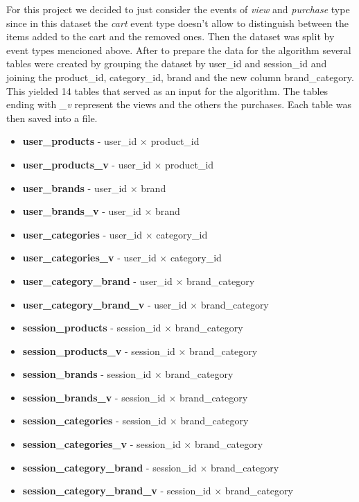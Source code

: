 For this project we decided to just consider the events of \textit{view} and \textit{purchase} type since 
in this dataset the \textit{cart} event type doesn't allow to distinguish between the items added to the cart and the removed ones.
Then the dataset was split by event types mencioned above. After to prepare the data for the algorithm several tables were created by grouping the dataset by user\_id and session\_id and
joining the product\_id, category\_id, brand and the new column brand\_category.
This yielded 14 tables that served as an input for the algorithm.
The tables ending with \textit{\_v} represent the views and the others the purchases.
Each table was then saved into a file.
\begin{itemize}
    \item \textbf{user\_products} - user\_id $\times$ product\_id
    \item \textbf{user\_products\_v} - user\_id $\times$ product\_id
    \item \textbf{user\_brands} - user\_id $\times$ brand
    \item \textbf{user\_brands\_v} - user\_id $\times$ brand
    \item \textbf{user\_categories} - user\_id $\times$ category\_id
    \item \textbf{user\_categories\_v} - user\_id $\times$ category\_id
    \item \textbf{user\_category\_brand} - user\_id $\times$ brand\_category
    \item \textbf{user\_category\_brand\_v} - user\_id $\times$ brand\_category
    \item \textbf{session\_products} - session\_id $\times$ brand\_category
    \item \textbf{session\_products\_v} - session\_id $\times$ brand\_category
    \item \textbf{session\_brands }- session\_id $\times$ brand\_category
    \item \textbf{session\_brands\_v} - session\_id $\times$ brand\_category
    \item \textbf{session\_categories} - session\_id $\times$ brand\_category
    \item \textbf{session\_categories\_v} - session\_id $\times$ brand\_category
    \item \textbf{session\_category\_brand} - session\_id $\times$ brand\_category
    \item \textbf{session\_category\_brand\_v} - session\_id $\times$ brand\_category
\end{itemize}
